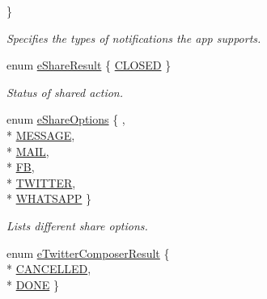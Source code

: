 \begin{DoxyCompactItemize}
 \}
\begin{DoxyCompactList}\small\item\em Specifies the types of notifications the app supports. \end{DoxyCompactList}\item 
enum \hyperlink{namespace_voxel_busters_1_1_native_plugins_ac2d9045086d3df4f9c057613fe7702dd}{e\+Share\+Result} \{ \hyperlink{namespace_voxel_busters_1_1_native_plugins_ac2d9045086d3df4f9c057613fe7702dda110ccf2f5d2ff4eda1fd1a494293467d}{C\+L\+O\+S\+E\+D}
 \}
\begin{DoxyCompactList}\small\item\em Status of shared action. \end{DoxyCompactList}\item 
enum \hyperlink{namespace_voxel_busters_1_1_native_plugins_a96ecd12080e18bce52fed6a15bee7367}{e\+Share\+Options} \{ , \\*
\hyperlink{namespace_voxel_busters_1_1_native_plugins_a96ecd12080e18bce52fed6a15bee7367a90791ed805bd5b00d78527d39d9ef7e4}{M\+E\+S\+S\+A\+G\+E}, 
\\*
\hyperlink{namespace_voxel_busters_1_1_native_plugins_a96ecd12080e18bce52fed6a15bee7367aa8ec3492f1a1296c01d725428c42bb2c}{M\+A\+I\+L}, 
\\*
\hyperlink{namespace_voxel_busters_1_1_native_plugins_a96ecd12080e18bce52fed6a15bee7367a30781f1fc2f9342ceb1ad2f6f35a51db}{F\+B}, 
\\*
\hyperlink{namespace_voxel_busters_1_1_native_plugins_a96ecd12080e18bce52fed6a15bee7367a86581d12931346ccfd9ac5ee5eb9e98b}{T\+W\+I\+T\+T\+E\+R}, 
\\*
\hyperlink{namespace_voxel_busters_1_1_native_plugins_a96ecd12080e18bce52fed6a15bee7367abc885f758a01c807e3af0c750d060f9f}{W\+H\+A\+T\+S\+A\+P\+P}
 \}
\begin{DoxyCompactList}\small\item\em Lists different share options. \end{DoxyCompactList}\item 
enum \hyperlink{namespace_voxel_busters_1_1_native_plugins_a6b27d398d97a7d2de511f9aa2244fcc0}{e\+Twitter\+Composer\+Result} \{ \\*
\hyperlink{namespace_voxel_busters_1_1_native_plugins_a6b27d398d97a7d2de511f9aa2244fcc0a9f935beb31030ad0d4d26126c0f39bf2}{C\+A\+N\+C\+E\+L\+L\+E\+D}, 
\\*
\hyperlink{namespace_voxel_busters_1_1_native_plugins_a6b27d398d97a7d2de511f9aa2244fcc0a2ba22e58ca17bb728d522bba36cf8350}{D\+O\+N\+E}
 \}

\end{DoxyCompactItemize}
